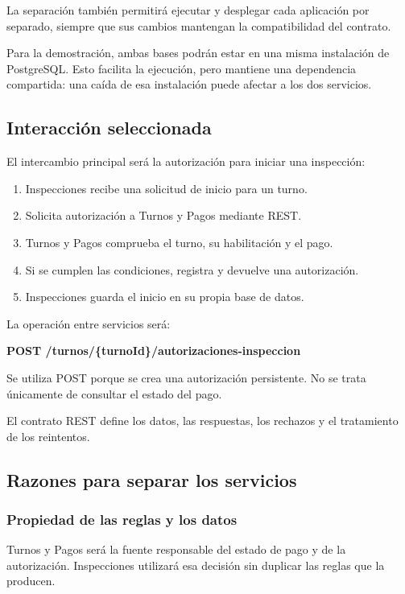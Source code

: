 \documentclass[11pt,a4paper]{article}
\begin{document}
	La separación también permitirá ejecutar y desplegar cada aplicación por separado, siempre que sus cambios mantengan la compatibilidad del contrato.
	
	Para la demostración, ambas bases podrán estar en una misma instalación de PostgreSQL. Esto facilita la ejecución, pero mantiene una dependencia compartida: una caída de esa instalación puede afectar a los dos servicios.
	
	\subsection{Interacción seleccionada}
	
	El intercambio principal será la autorización para iniciar una inspección:
	
	\begin{enumerate}[nosep]
		\item Inspecciones recibe una solicitud de inicio para un turno.
		\item Solicita autorización a Turnos y Pagos mediante REST.
		\item Turnos y Pagos comprueba el turno, su habilitación y el pago.
		\item Si se cumplen las condiciones, registra y devuelve una autorización.
		\item Inspecciones guarda el inicio en su propia base de datos.
	\end{enumerate}
	
	La operación entre servicios será:
	
	\textbf{POST /turnos/\{turnoId\}/autorizaciones-inspeccion}
	
	Se utiliza POST porque se crea una autorización persistente. No se trata únicamente de consultar el estado del pago.
	
	El contrato REST define los datos, las respuestas, los rechazos y el tratamiento de los reintentos.
	
	\subsection{Razones para separar los servicios}
	
	\subsubsection{Propiedad de las reglas y los datos}
	
	Turnos y Pagos será la fuente responsable del estado de pago y de la autorización. Inspecciones utilizará esa decisión sin duplicar las reglas que la producen.
	
\end{document}
